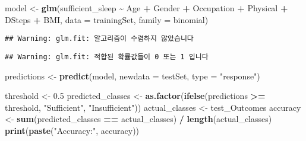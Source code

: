 \documentclass[
  11pt,
]{article}
\newenvironment{Shaded}{\begin{snugshade}}{\end{snugshade}}
\newcommand{\AttributeTok}[1]{\textcolor[rgb]{0.13,0.29,0.53}{#1}}
\newcommand{\FloatTok}[1]{\textcolor[rgb]{0.00,0.00,0.81}{#1}}
\newcommand{\FunctionTok}[1]{\textcolor[rgb]{0.13,0.29,0.53}{\textbf{#1}}}
\newcommand{\NormalTok}[1]{#1}
\newcommand{\OtherTok}[1]{\textcolor[rgb]{0.56,0.35,0.01}{#1}}
\newcommand{\SpecialCharTok}[1]{\textcolor[rgb]{0.81,0.36,0.00}{\textbf{#1}}}
\newcommand{\StringTok}[1]{\textcolor[rgb]{0.31,0.60,0.02}{#1}}
\begin{document}
\begin{Shaded}
\end{Shaded}

\begin{Shaded}
\begin{Highlighting}[]
\NormalTok{model }\OtherTok{\textless{}{-}} \FunctionTok{glm}\NormalTok{(sufficient\_sleep }\SpecialCharTok{\textasciitilde{}}\NormalTok{ Age }\SpecialCharTok{+}\NormalTok{ Gender }\SpecialCharTok{+}\NormalTok{ Occupation }\SpecialCharTok{+}\NormalTok{ Physical }\SpecialCharTok{+}\NormalTok{ DSteps }\SpecialCharTok{+}\NormalTok{ BMI, }\AttributeTok{data =}\NormalTok{ trainingSet, }\AttributeTok{family =}\NormalTok{ binomial)}
\end{Highlighting}
\end{Shaded}

\begin{verbatim}
## Warning: glm.fit: 알고리즘이 수렴하지 않았습니다
\end{verbatim}

\begin{verbatim}
## Warning: glm.fit: 적합된 확률값들이 0 또는 1 입니다
\end{verbatim}

\begin{Shaded}
\begin{Highlighting}[]
\NormalTok{predictions }\OtherTok{\textless{}{-}} \FunctionTok{predict}\NormalTok{(model, }\AttributeTok{newdata =}\NormalTok{ testSet, }\AttributeTok{type =} \StringTok{"response"}\NormalTok{)}

\NormalTok{threshold }\OtherTok{\textless{}{-}} \FloatTok{0.5}  
\NormalTok{predicted\_classes }\OtherTok{\textless{}{-}} \FunctionTok{as.factor}\NormalTok{(}\FunctionTok{ifelse}\NormalTok{(predictions }\SpecialCharTok{\textgreater{}=}\NormalTok{ threshold, }\StringTok{"Sufficient"}\NormalTok{, }\StringTok{"Insufficient"}\NormalTok{))}
\NormalTok{actual\_classes }\OtherTok{\textless{}{-}}\NormalTok{ test\_Outcomes}
\NormalTok{accuracy }\OtherTok{\textless{}{-}} \FunctionTok{sum}\NormalTok{(predicted\_classes }\SpecialCharTok{==}\NormalTok{ actual\_classes) }\SpecialCharTok{/} \FunctionTok{length}\NormalTok{(actual\_classes)}
\FunctionTok{print}\NormalTok{(}\FunctionTok{paste}\NormalTok{(}\StringTok{"Accuracy:"}\NormalTok{, accuracy))}
\end{Highlighting}
\end{Shaded}
\end{document}
